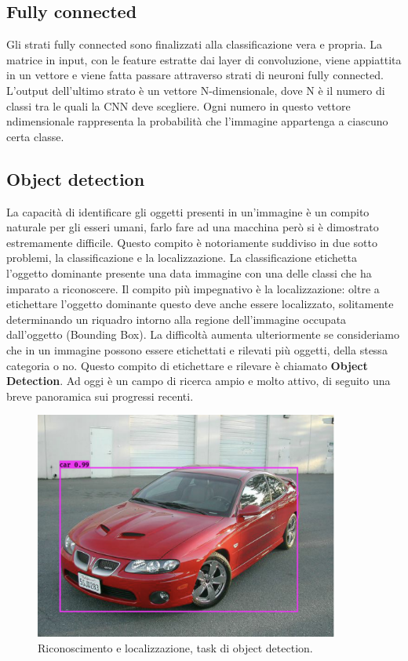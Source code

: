 \subsection{Fully connected}
Gli strati fully connected sono finalizzati alla classificazione vera e propria. La matrice in input, con le feature estratte dai layer di convoluzione, viene appiattita in un vettore e viene fatta passare  attraverso strati di neuroni fully connected. L'output dell'ultimo strato è un vettore N-dimensionale, dove N è il numero di classi tra le quali la CNN deve scegliere. Ogni numero in questo vettore ndimensionale rappresenta la probabilità che l'immagine appartenga a ciascuno certa classe.



\subsection{Object detection}

La capacità di identificare gli oggetti presenti in un'immagine è un compito naturale per gli esseri umani, farlo fare ad una macchina però si è dimostrato estremamente difficile. Questo compito è notoriamente suddiviso in due sotto problemi, la classificazione e la localizzazione. La classificazione etichetta l'oggetto dominante presente una data immagine con una delle classi che ha imparato a riconoscere. Il compito più impegnativo è la localizzazione: oltre a etichettare l'oggetto dominante questo deve anche essere localizzato, solitamente determinando un riquadro intorno alla regione dell'immagine occupata dall'oggetto (Bounding Box). La difficoltà aumenta ulteriormente se consideriamo che in un immagine possono essere etichettati e rilevati più oggetti, della stessa categoria o no. Questo compito di etichettare e rilevare è chiamato \textbf{Object Detection}. Ad oggi è un campo di ricerca ampio e molto attivo, di seguito una breve panoramica sui progressi recenti.

\begin{figure}[htb]
	\centering
	\includegraphics[width = 100mm]{images/car_od.png}
	\caption{Riconoscimento e localizzazione, task di object detection.}
	\label{car_od}
\end{figure}

